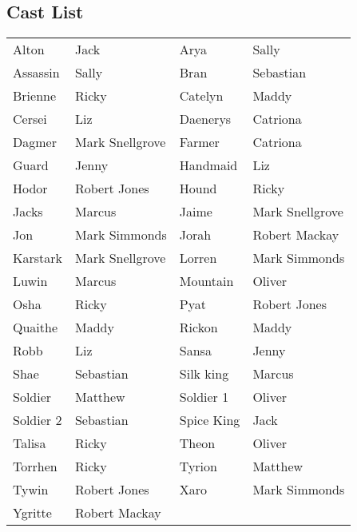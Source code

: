 \subsection*{Cast List}
\begin{tabular}{ll|ll}\\
Alton & Jack &  Arya & Sally\\
Assassin & Sally &  Bran & Sebastian\\
Brienne & Ricky &  Catelyn & Maddy\\
Cersei & Liz &  Daenerys & Catriona\\
Dagmer & Mark Snellgrove &  Farmer & Catriona\\
Guard & Jenny &  Handmaid & Liz\\
Hodor & Robert Jones &  Hound & Ricky\\
Jacks & Marcus &  Jaime & Mark Snellgrove\\
Jon & Mark Simmonds &  Jorah & Robert Mackay\\
Karstark & Mark Snellgrove &  Lorren & Mark Simmonds\\
Luwin & Marcus &  Mountain & Oliver\\
Osha & Ricky &  Pyat & Robert Jones\\
Quaithe & Maddy &  Rickon & Maddy\\
Robb & Liz &  Sansa & Jenny\\
Shae & Sebastian &  Silk king & Marcus\\
Soldier & Matthew &  Soldier 1 & Oliver\\
Soldier 2 & Sebastian &  Spice King & Jack\\
Talisa & Ricky &  Theon & Oliver\\
Torrhen & Ricky &  Tyrion & Matthew\\
Tywin & Robert Jones &  Xaro & Mark Simmonds\\
Ygritte & Robert Mackay &  \end{tabular}
